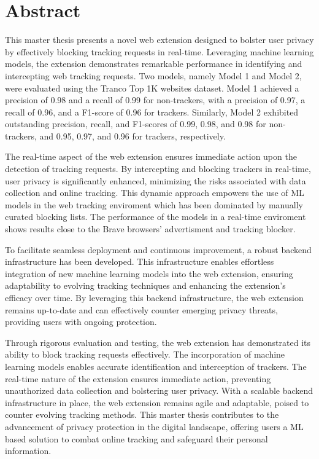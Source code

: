 \chapter*{Abstract}
\label{cha:abstract}

This master thesis presents a novel web extension designed to bolster user privacy by effectively blocking tracking
requests in real-time. Leveraging machine learning models, the extension demonstrates remarkable performance in identifying
and intercepting web tracking requests. Two models, namely Model 1 and Model 2, were evaluated using the Tranco Top 1K websites dataset.
Model 1 achieved a precision of 0.98 and a recall of 0.99 for non-trackers, with a precision of 0.97, a recall of 0.96, and a
F1-score of 0.96 for trackers. Similarly, Model 2 exhibited outstanding precision, recall, and F1-scores of 0.99, 0.98, and 0.98
for non-trackers, and 0.95, 0.97, and 0.96 for trackers, respectively.

The real-time aspect of the web extension ensures immediate action upon the detection of tracking requests. By intercepting
and blocking trackers in real-time, user privacy is significantly enhanced, minimizing the risks associated with data collection
and online tracking. This dynamic approach empowers the use of ML models in the web tracking enviroment which has been dominated 
by manually curated blocking lists. The performance of the models in a real-time enviroment shows results close to the Brave browsers'
advertisment and tracking blocker.

To facilitate seamless deployment and continuous improvement, a robust backend infrastructure has been developed. This infrastructure
enables effortless integration of new machine learning models into the web extension, ensuring adaptability to evolving tracking
techniques and enhancing the extension's efficacy over time. By leveraging this backend infrastructure, the web extension remains
up-to-date and can effectively counter emerging privacy threats, providing users with ongoing protection.

Through rigorous evaluation and testing, the web extension has demonstrated its ability to block tracking requests effectively.
The incorporation of machine learning models enables accurate identification and interception of trackers. 
The real-time nature of the extension ensures immediate action, preventing unauthorized data
collection and bolstering user privacy. With a scalable backend infrastructure in place, the web extension remains agile and
adaptable, poised to counter evolving tracking methods. This master thesis contributes to the advancement of privacy protection
in the digital landscape, offering users a ML based solution to combat online tracking and safeguard their personal information.


